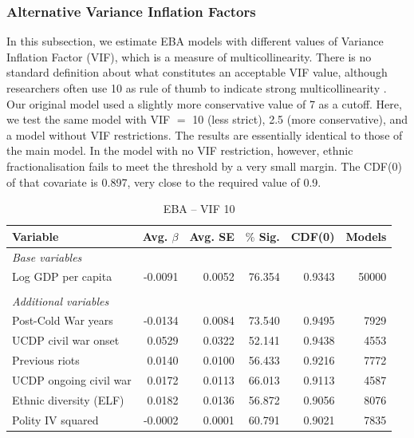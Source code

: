 \subsubsection{Alternative Variance Inflation Factors}

In this subsection, we estimate EBA models with different values of Variance Inflation Factor (VIF), which is a measure of multicollinearity. There is no standard definition about what constitutes an acceptable VIF value, although researchers often use 10 as rule of thumb to indicate strong multicollinearity \citep[674]{o2007caution}. Our original model used a slightly more conservative value of 7 as a cutoff. Here, we test the same model with VIF $=$ 10 (less strict), 2.5 (more conservative), and a model without VIF restrictions. The results are essentially identical to those of the main model. In the model with no VIF restriction, however, ethnic fractionalisation fails to meet the threshold by a very small margin. The CDF(0) of that covariate is 0.897, very close to the required value of 0.9. 

\vspace{1cm}

\begin{table}[H]
\centering
\begin{tabular}{lrrrrr}
\hline
\textbf{Variable} & \textbf{Avg. $\beta$} & \textbf{Avg. SE} & \textbf{$\%$ Sig.} & \textbf{CDF(0)} & \textbf{Models} \\ \hline
\textit{Base variables} &  &  &  &  &  \\
Log GDP per capita & -0.0091 & 0.0052 & 76.354 & 0.9343 & 50000 \\
 &  &  &  &  &  \\
\textit{Additional variables} &  &  &  &  &  \\
Post-Cold War years & -0.0134 & 0.0084 & 73.540 & 0.9495 & 7929 \\
UCDP civil war onset & 0.0529 & 0.0322 & 52.141 & 0.9438 & 4553 \\
Previous riots & 0.0140 & 0.0100 & 56.433 & 0.9216 & 7772 \\
UCDP ongoing civil war & 0.0172 & 0.0113 & 66.013 & 0.9113 & 4587 \\
Ethnic diversity (ELF) & 0.0182 & 0.0136 & 56.872 & 0.9056 & 8076 \\
Polity IV squared & -0.0002 & 0.0001 & 60.791 & 0.9021 & 7835 \\ \hline
\end{tabular}
\caption{EBA -- VIF 10}
\label{tab:mk-high-vif}
\end{table}


